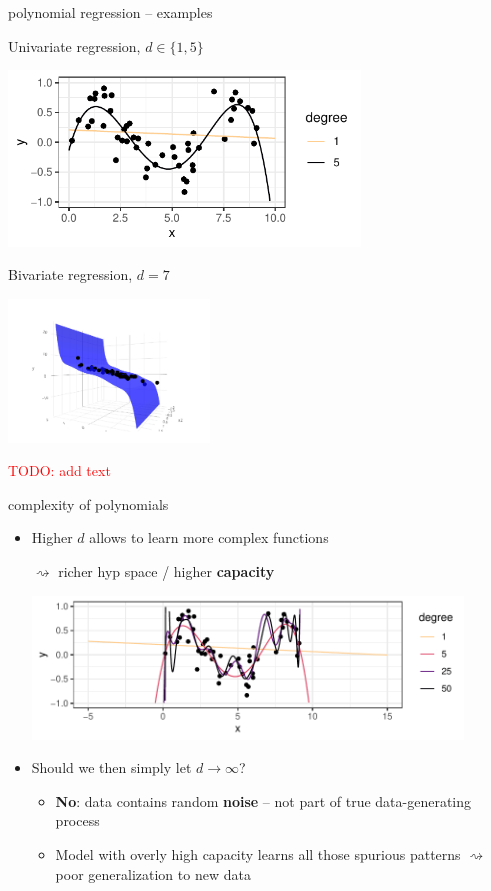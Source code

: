 \documentclass[11pt,compress,t,notes=noshow, xcolor=table]{beamer}
\begin{document}
\begin{frame}{polynomial regression -- examples}

Univariate regression, $d \in \{1, 5\}$

\includegraphics[width=0.7\textwidth]{figure/reg_poly_univ_2}

Bivariate regression, $d = 7$

\includegraphics[width=0.4\textwidth, trim=80 80 80 80, clip]{
figure/reg_poly_biv}

\textcolor{red}{TODO: add text}

\end{frame}


\begin{vbframe}{complexity of polynomials}

\begin{itemize}
  \item Higher $d$ allows to learn more complex functions 
  
  $\rightsquigarrow$ richer hyp space / higher \textbf{capacity}
  
  \vfill
  \includegraphics[width=0.9\textwidth]{figure/reg_poly_univ_4}
  \item Should we then simply let $d \rightarrow \infty$?
  \begin{itemize}
    \item \textbf{No}: data contains random \textbf{noise} -- not part of true
    data-generating process
    \item Model with overly high capacity learns all those spurious patterns
    $\rightsquigarrow$ poor generalization to new data
  \end{itemize}
\end{itemize}

\end{vbframe}
\end{document}
